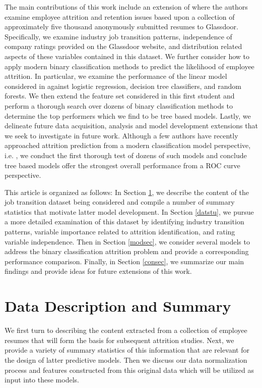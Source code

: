 \documentclass[10pt]{article}
\begin{document}
The main contributions of this work include an extension of \cite{Smart2016} where the authors 
examine employee 
attrition and retention issues based upon 
a collection of approximately five thousand anonymously submitted resumes to Glassdoor.  
Specifically, we examine industry job transition patterns, independence of company ratings 
provided on the Glassdoor website, and distribution related aspects of these variables 
contained in this dataset.  We further consider how to apply modern binary classification 
methods to predict the likelihood of employee attrition.  In particular, we examine the 
performance of the linear model considered in \cite{Smart2016} against logistic regression, 
decision tree classifiers, and random forests.  We then extend the feature set considered in this 
first student 
and perform a thorough search over dozens of binary classification methods to determine 
the top performers which we find to be tree based models.
 Lastly, we delineate 
future data acquisition, analysis and model development extensions that we seek to investigate 
in future work. Although a few authors have recently approached attrition prediction 
from a modern classification model perspective, i.e. \cite{Fri2018}, we conduct the first 
thorough test of dozens of such models and conclude tree based models offer the strongest 
overall performance from a ROC curve perspective.

This article is organized as follows: In Section \ref{datsec}, we describe the content 
of the job transition dataset being considered and compile a number of 
summary statistics that motivate latter model development.  In Section \ref{datstu},
we pursue a more detailed examination of this dataset by identifying industry transition 
patterns, variable importance related to attrition identification, and 
rating variable independence.  Then in Section \ref{modsec}, we consider several 
models to address the binary classification attrition problem and provide a 
corresponding performance comparison.  Finally, in Section \ref{consec}, we 
summarize our main findings and provide ideas for future extensions of this work.

\section{Data Description and Summary} \label{datsec}

We first turn to describing the content extracted from a collection of 
employee resumes that will form the basis for subsequent attrition studies. 
Next, we provide a variety of summary statistics of this information that 
are relevant for the design of latter predictive models.  Then we discuss 
our data normalization process and 
features constructed from this original data which will be utilized 
as input into these models.
\end{document}
